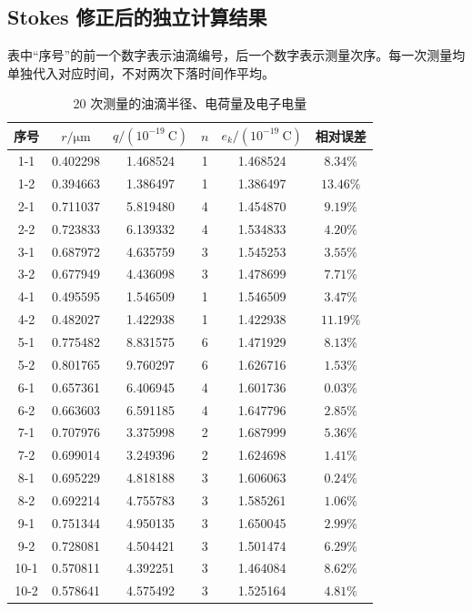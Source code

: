 \documentclass[UTF8,a4paper,12pt]{ctexart}
\begin{document}
\clearpage
\subsection{Stokes 修正后的独立计算结果}
表中“序号”的前一个数字表示油滴编号，后一个数字表示测量次序。每一次测量均单独代入对应时间，不对两次下落时间作平均。
\begin{table}[htbp]
  \centering
  \caption{20 次测量的油滴半径、电荷量及电子电量}
  \small
  \begin{tabular}{cccccc}
    \toprule
    序号 & $r/\mathrm{\mu m}$ & $q/(10^{-19}\ \mathrm{C})$ & $n$ & $e_k/(10^{-19}\ \mathrm{C})$ & 相对误差 \\
    \midrule
    1-1  & 0.402298 & 1.468524 & 1 & 1.468524 & $8.34\%$ \\
    1-2  & 0.394663 & 1.386497 & 1 & 1.386497 & $13.46\%$ \\
    2-1  & 0.711037 & 5.819480 & 4 & 1.454870 & $9.19\%$ \\
    2-2  & 0.723833 & 6.139332 & 4 & 1.534833 & $4.20\%$ \\
    3-1  & 0.687972 & 4.635759 & 3 & 1.545253 & $3.55\%$ \\
    3-2  & 0.677949 & 4.436098 & 3 & 1.478699 & $7.71\%$ \\
    4-1  & 0.495595 & 1.546509 & 1 & 1.546509 & $3.47\%$ \\
    4-2  & 0.482027 & 1.422938 & 1 & 1.422938 & $11.19\%$ \\
    5-1  & 0.775482 & 8.831575 & 6 & 1.471929 & $8.13\%$ \\
    5-2  & 0.801765 & 9.760297 & 6 & 1.626716 & $1.53\%$ \\
    6-1  & 0.657361 & 6.406945 & 4 & 1.601736 & $0.03\%$ \\
    6-2  & 0.663603 & 6.591185 & 4 & 1.647796 & $2.85\%$ \\
    7-1  & 0.707976 & 3.375998 & 2 & 1.687999 & $5.36\%$ \\
    7-2  & 0.699014 & 3.249396 & 2 & 1.624698 & $1.41\%$ \\
    8-1  & 0.695229 & 4.818188 & 3 & 1.606063 & $0.24\%$ \\
    8-2  & 0.692214 & 4.755783 & 3 & 1.585261 & $1.06\%$ \\
    9-1  & 0.751344 & 4.950135 & 3 & 1.650045 & $2.99\%$ \\
    9-2  & 0.728081 & 4.504421 & 3 & 1.501474 & $6.29\%$ \\
    10-1 & 0.570811 & 4.392251 & 3 & 1.464084 & $8.62\%$ \\
    10-2 & 0.578641 & 4.575492 & 3 & 1.525164 & $4.81\%$ \\
    \bottomrule
  \end{tabular}
\end{table}
\end{document}
